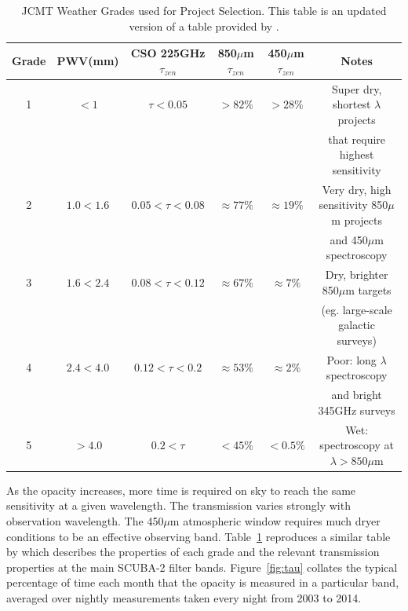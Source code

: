 \documentclass[]{spie}  %
\begin{document}
\begin{table}
\caption{JCMT Weather Grades used for Project Selection. This table is an updated version of a table provided by \cite{robson2002}.}
\label{tab:grades}
\begin{center}
\begin{tabular}{|c|c|c|c|c|c|}
\hline
\rule[-1ex]{0pt}{3.5ex}  Grade & PWV(mm) & CSO 225GHz $\tau_{zen}$ & 850$\mu$m $\tau_{zen}$ & 450$\mu$m $\tau_{zen}$ & Notes  \\
\hline
\rule[-1ex]{0pt}{3.5ex}  1 & $< 1$ & $\tau<0.05$ & $> 82\%$ &   $ > 28\%$& Super dry, shortest $\lambda$ projects\\&&&&& that require highest sensitivity\\
\hline
\rule[-1ex]{0pt}{3.5ex}  2 & $1.0 < 1.6$ & $0.05<\tau<0.08$ &  $ \approx77\%$ & $\approx19\%$ &Very dry, high sensitivity 850$\mu$m projects\\&&&&& and 450$\mu$m spectroscopy\\
\hline
\rule[-1ex]{0pt}{3.5ex}  3 & $1.6 < 2.4$  & $0.08<\tau<0.12$ &  $\approx67\%$ & $\approx7\%$ & Dry, brighter 850$\mu$m targets\\ &&&&&(eg. large-scale galactic surveys)\\
\hline
\rule[-1ex]{0pt}{3.5ex}  4 & $2.4 < 4.0$ & $0.12<\tau<0.2$ &  $\approx53\%$ & $\approx2\%$ & Poor: long $\lambda$ spectroscopy \\&&&&&and bright 345GHz surveys\\
\hline
\rule[-1ex]{0pt}{3.5ex}  5 & $ > 4.0 $ & $0.2<\tau$ & $ < 45\%$ & $< 0.5\%$&  Wet: spectroscopy at $\lambda > 850 \mu$m \\
\hline

\end{tabular}
\end{center}
\end{table}

As the opacity increases, more time is required on sky to reach the
same sensitivity at a given wavelength. The transmission varies
strongly with observation wavelength. The 450$\mu$m atmospheric window
requires much dryer conditions to be an effective observing
band. Table~\ref{tab:grades} reproduces a similar table by
\cite{robson2002} which describes the properties of each grade and the
relevant transmission properties at the main SCUBA-2 filter
bands. Figure~\ref{fig:tau} collates the typical percentage of time
each month that the opacity is measured in a particular band, averaged
over nightly measurements taken every night from 2003 to 2014.
\end{document}
